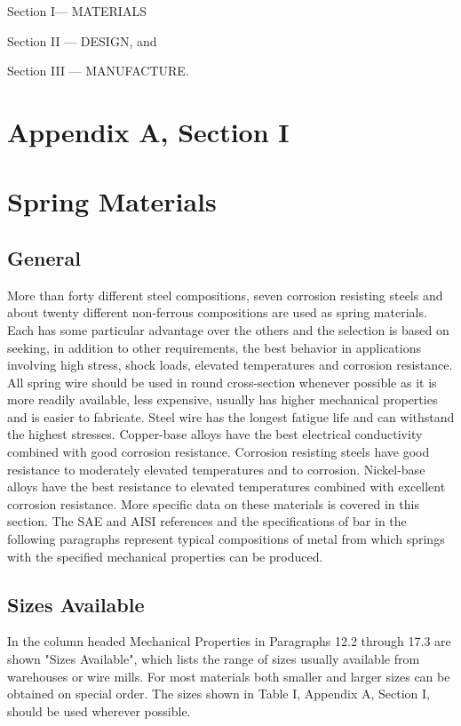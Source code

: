 \documentclass[10pt]{article}
\begin{document}
Section I— MATERIALS 

Section II — DESIGN, and 

Section III — MANUFACTURE.

\clearpage
\section*{Appendix A, Section I}

\section{Spring Materials} %
\subsection{General} %
More than forty different steel compositions, seven corrosion resisting steels and about twenty different non-ferrous compositions are used as spring materials.
Each has some particular advantage over the others and the selection is based on seeking, in addition to other requirements, the best behavior in applications involving high stress, shock loads, elevated temperatures and corrosion resistance.
All spring wire should be used in round cross-section whenever possible as it is more readily available, less expensive, usually has higher mechanical properties and is easier to fabricate. 
Steel wire has the longest fatigue life and can withstand the highest stresses. 
Copper-base alloys have the best electrical conductivity combined with good corrosion resistance. 
Corrosion resisting steels have good resistance to moderately elevated temperatures and to corrosion. 
Nickel-base alloys have the best resistance to elevated temperatures combined with excellent corrosion resistance. 
More specific data on these materials is covered in this section. 
The SAE and AISI references and the specifications of bar in the following paragraphs represent typical compositions of metal from which springs with the specified mechanical properties can be produced.

\subsection{Sizes Available} %
In the column headed Mechanical Properties in Paragraphs 12.2 through 17.3 are shown "Sizes Available", which lists the range of sizes usually available from warehouses or wire mills. 
For most materials both smaller and larger sizes can be obtained on special order. 
The sizes shown in Table I, Appendix A, Section I, should be used wherever possible.
\end{document}
